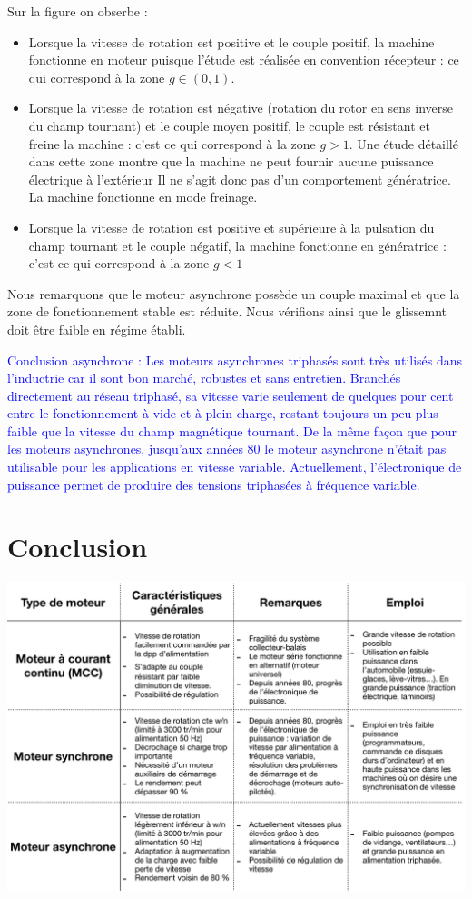 \documentclass{article}
\begin{document}
Sur la figure on obserbe :

\begin{itemize}
    \item Lorsque la vitesse de rotation est positive et le couple positif, la machine fonctionne en moteur puisque l'étude est réalisée en convention récepteur : ce qui correspond à la zone $g \in (0,1)$.
    \item Lorsque la vitesse de rotation est négative (rotation du rotor en sens inverse du champ tournant) et le couple moyen positif, le couple est résistant et freine la machine : c'est ce qui correspond à la zone $g > 1$. Une étude détaillé dans cette zone montre que la machine ne peut fournir aucune puissance électrique à l'extérieur Il ne s'agit donc pas d'un comportement génératrice. La machine fonctionne en mode freinage.
    \item Lorsque la vitesse de rotation est positive et supérieure à la pulsation du champ tournant et le couple négatif, la machine fonctionne en génératrice : c'est ce qui correspond à la zone $g<1$
\end{itemize}

Nous remarquons que le moteur asynchrone possède un couple maximal et que la zone de fonctionnement stable est réduite. Nous vérifions ainsi que le glissemnt doit être faible en régime établi.\medskip


\textcolor{blue}{Conclusion asynchrone : Les moteurs asynchrones triphasés sont très utilisés dans l'inductrie car il sont bon marché, robustes et sans entretien. Branchés directement au réseau triphasé, sa vitesse varie seulement de quelques pour cent entre le fonctionnement à vide et à plein charge, restant toujours un peu plus faible que la vitesse du champ magnétique tournant. De la même façon que pour les moteurs asynchrones, jusqu'aux années 80 le moteur asynchrone n'était pas utilisable pour les applications en vitesse variable. Actuellement, l'électronique de puissance permet de produire des tensions triphasées à fréquence variable.}


\section*{Conclusion}

\begin{center}
    \includegraphics[scale=0.5]{Conclusiontableau.png}
\end{center}
\end{document}
